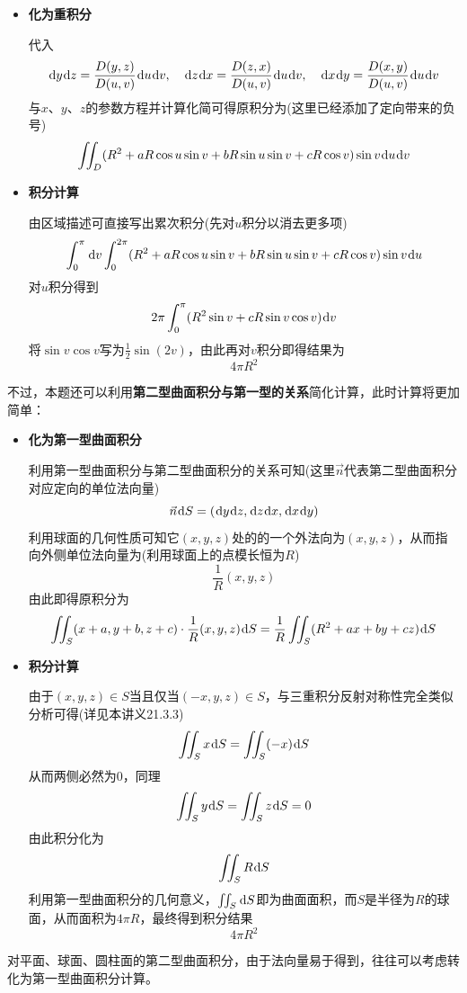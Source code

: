 \documentclass[a4paper,UTF8,fontset=windows,AutoFakeBold]{ctexart}
\newcommand*{\dr}{\hspace{0.07em}\mathrm{d}}
\newcommand*{\note}{\noindent *}
\theoremstyle{ex}
\begin{document}
\begin{enumerate}
{\begin{itemize}
            \item \textbf{化为重积分}
            
            代入
            $$\dr y\dr z=\frac{D(y,z)}{D(u,v)}\dr u\dr v,\quad\dr z\dr x=\frac{D(z,x)}{D(u,v)}\dr u\dr v,\quad\dr x\dr y=\frac{D(x,y)}{D(u,v)}\dr u\dr v$$
            与$x$、$y$、$z$的参数方程并计算化简可得原积分为(这里已经添加了定向带来的负号)
            $$\iint_D(R^2+aR\cos u\sin v+bR\sin u\sin v+cR\cos v)\sin v\dr u\dr v$$

            \item \textbf{积分计算}
            
            由区域描述可直接写出累次积分(先对$u$积分以消去更多项)
            $$\int_0^\pi\dr v\int_0^{2\pi}(R^2+aR\cos u\sin v+bR\sin u\sin v+cR\cos v)\sin v\dr u$$
            对$u$积分得到
            $$2\pi\int_0^{\pi}(R^2\sin v+cR\sin v\cos v)\dr v$$
            将$\sin v\cos v$写为$\frac{1}{2}\sin(2v)$，由此再对$v$积分即得结果为
            $$4\pi R^2$$
        \end{itemize}

        不过，本题还可以利用\textbf{第二型曲面积分与第一型的关系}简化计算，此时计算将更加简单：
        \begin{itemize}
            \item \textbf{化为第一型曲面积分}

            利用第一型曲面积分与第二型曲面积分的关系可知(这里$\vec{n}$代表第二型曲面积分对应定向的单位法向量)
            $$\vec{n}\dr S=(\dr y\dr z,\dr z\dr x,\dr x\dr y)$$
            利用球面的几何性质可知它$(x,y,z)$处的的一个外法向为$(x,y,z)$，从而指向外侧单位法向量为(利用球面上的点模长恒为$R$)
            $$\frac{1}{R}(x,y,z)$$
            由此即得原积分为
            $$\iint_S(x+a,y+b,z+c)\cdot\frac{1}{R}(x,y,z)\dr S=\frac{1}{R}\iint_S(R^2+ax+by+cz)\dr S$$

            \item \textbf{积分计算}
            
            由于$(x,y,z)\in S$当且仅当$(-x,y,z)\in S$，与三重积分反射对称性完全类似分析可得(详见本讲义21.3.3)
            $$\iint_Sx\dr S=\iint_S(-x)\dr S$$
            从而两侧必然为0，同理
            $$\iint_Sy\dr S=\iint_Sz\dr S=0$$
            由此积分化为
            $$\iint_SR\dr S$$
            利用第一型曲面积分的几何意义，$\iint_S\dr S$即为曲面面积，而$S$是半径为$R$的球面，从而面积为$4\pi R$，最终得到积分结果
            $$4\pi R^2$$
        \end{itemize}

        \note 对平面、球面、圆柱面的第二型曲面积分，由于法向量易于得到，往往可以考虑转化为第一型曲面积分计算。
    }


\end{enumerate}
\end{document}
